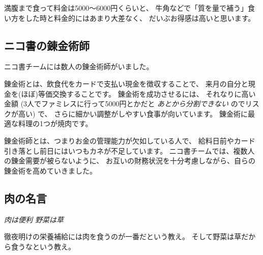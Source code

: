 満腹まで食って料金は5000〜6000円くらいと、
牛角などで「質を量で補う」食い方をした時と料金的にはあまり大差なく、
だいぶお得感は高いと思います。

\subsection{ニコ書の錬金術師}

ニコ書チームには数人の錬金術師がいました。

錬金術とは、飲食代をカードで支払い現金を徴収することで、
来月の自分と現金を(ほぼ)等価交換することです。 錬金術を成功させるには、
それなりに高い金額 (3人でファミレスに行って5000円とかだと
\emph{あとから分割できない} のでリスクが高い) で、
さらに細かい調整がしやすい食事が向いています。
錬金術に最適な料理の1つが焼肉です。

錬金術師とは、つまりお金の管理能力が欠如している人で、
給料日前やカード引き落とし前日にはいつもカネが不足しています。
ニコ書チームでは、複数人の錬金需要が被らないように、
お互いの財務状況を十分考慮しながら、自らの錬金術を高めていきました。

\subsection{肉の名言}

\emph{肉は便利 野菜は草}

徹夜明けの栄養補給には肉を食うのが一番だという教え。
そして野菜は草だから食うなという教え。
